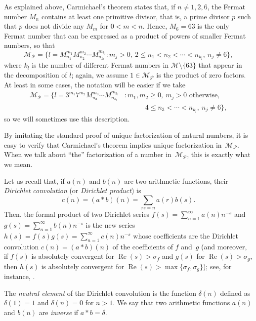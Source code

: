 \documentclass[11pt, a4paper]{article}
\renewcommand{\Re}{\operatorname{Re}}
\newcommand{\calM}{\mathcal{M}}
\newcommand{\Mp}{\calM_{\mathcal{P}}}
\theoremstyle{plain}
\theoremstyle{definition}
\begin{document}
As explained above, Carmichael's theorem 
states that, if $n \ne 1,2,6$, the Fermat number $M_{n}$ contains at least one primitive divisor, that is, a prime divisor $p$ such that $p$ does not divide any $M_m$ for $0<m<n$. Hence, $M_{6}=63$ is the only Fermat number that can be expressed as a product of powers of smaller Fermat numbers, so that
\begin{equation}
\label{eq:Mp}
  \Mp = \Big\{
  l = M_{n_1}^{m_1}M_{n_2}^{m_2} \cdots M_{n_{k_l}}^{m_{k_l}} :
  m_{j}>0, \ 2 \le n_1<n_2<\cdots<n_{k_l}, \ n_{j}\neq 6 \Big\}, 
\end{equation}
where $k_{l}$ is the number of different Fermat numbers in $\calM \setminus \{63\}$ that appear in the decomposition of $l$; again, we assume $1 \in \Mp$ is the product of zero factors. At least in some cases, the notation will be easier if we take
\begin{equation}
\label{eq:Mpalt}
\begin{aligned}
  \Mp = \Big\{
  l = 3^{m_1}7^{m_2} M_{n_3}^{m_3} \cdots M_{n_{k_l}}^{m_{k_l}} &:
  m_1, m_2 \ge 0,\ m_{j}>0 \text{ otherwise}, \\ 
  &\qquad\quad
  4 \le n_3<\cdots<n_{k_l}, \ n_{j}\neq 6 \Big\},
\end{aligned}
\end{equation}
so we will sometimes use this description.

By imitating the standard proof of unique factorization of natural numbers, it is easy to verify that Carmichael's theorem implies unique factorization in~$\Mp$. When we talk about ``the'' factorization of a number in~$\Mp$, this is exactly what we mean.

Let us recall that, if $a(n)$ and $b(n)$ are two arithmetic functions, their \textit{Dirichlet convolution} (or \textit{Dirichlet product}) is 
\[
  c(n) = (a*b)(n) = \sum_{rs=n} a(r)b(s).
\]
Then, the formal product of two Dirichlet series $f(s) = \sum_{n=1}^\infty a(n)n^{-s}$ and $g(s) = \sum_{n=1}^\infty b(n)n^{-s}$ is the new series $h(s) = f(s)g(s) = \sum_{n=1}^\infty c(n)n^{-s}$ whose coefficients are the Dirichlet convolution $c(n) = (a*b)(n)$ of the coefficients of $f$ and~$g$ (and moreover, if $f(s)$ is absolutely convergent for $\Re(s)>\sigma_f$ and $g(s)$ for $\Re(s)>\sigma_g$, then $h(s)$ is absolutely convergent for $\Re(s) > \max\{\sigma_f, \sigma_g\}$); see, for instance, \cite[Chapter~11]{Ap}. 

The \textit{neutral element} of the Dirichlet convolution is the function $\delta(n)$ defined as $\delta(1)=1$ and $\delta(n)=0$ for $n>1$. We say that two arithmetic functions $a(n)$ and $b(n)$ are \textit{inverse} if $a*b=\delta$.
\end{document}
